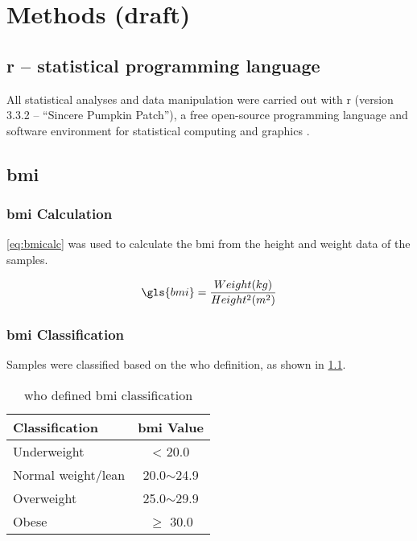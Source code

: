\chapter{Methods (draft)}
\label{ch:methods}

\section{\gls{r} -- statistical programming language}
\label{sec:r}

All statistical analyses and data manipulation were carried out with \gls{r} (version 3.3.2 -- ``Sincere Pumpkin Patch''), a free open-source programming language and software environment for statistical computing and graphics \citep{R2016}.

\section{\gls{bmi}}
\label{sec:bmi}

\subsection{\gls{bmi} Calculation}
\label{subsec:bmicalc}

\cref{eq:bmicalc}  was used to calculate the \gls{bmi} from the height and weight data of the samples.

\begin{equation}
	\label{eq:bmicalc}
	\gls{bmi} = \frac{Weight (kg)}{Height^2(m^2)}\\
\end{equation}

\subsection{\gls{bmi} Classification}
\label{subsec:bmiclassification}

Samples were classified based on the \gls{who} definition, as shown in \cref{tab:whobmiclass}.
\begin{table}[htb]
	\caption{\gls{who} defined \gls{bmi} classification}
	\label{tab:whobmiclass}
	\begin{center}
		\begin{tabular}{lc}
			Classification & \gls{bmi} Value\\
			\hline
			\rule{0pt}{2.25ex}Underweight & \textless{} 20.0\\
			Normal weight/lean & 20.0$\sim$24.9\\
			Overweight & 25.0$\sim$29.9\\
			Obese & $\geq{}$ 30.0\\
			\hline
			\hline
		\end{tabular}
	\end{center}
\end{table}

